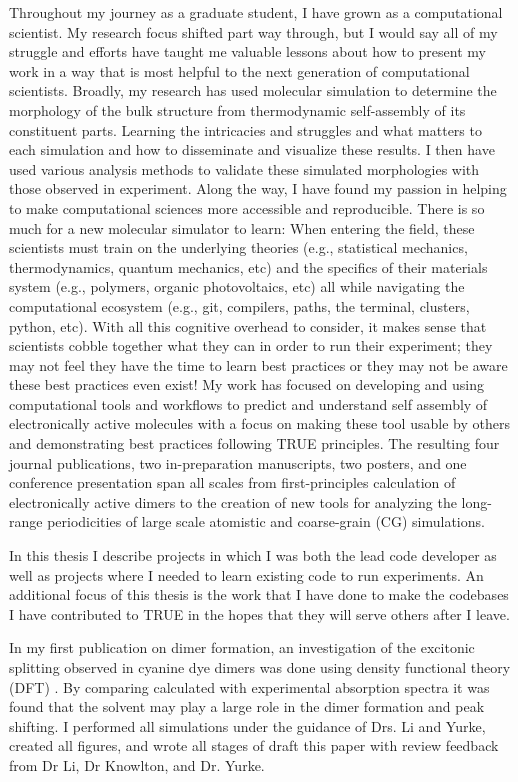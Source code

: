 Throughout my journey as a graduate student, I have grown as a computational scientist.
My research focus shifted part way through, but I would say all of my struggle and efforts have taught me valuable lessons about how to present my work in a way that is most helpful to the next generation of computational scientists.
Broadly, my research has used molecular simulation to determine the morphology of the bulk structure from thermodynamic self-assembly of its constituent parts. 
Learning the intricacies and struggles and what matters to each simulation and how to disseminate and visualize these results.
I then have used various analysis methods to validate these simulated morphologies with those observed in experiment. 
Along the way, I have found my passion in helping to make computational sciences more accessible and reproducible.
There is so much for a new molecular simulator to learn: When entering the field, these scientists must train on the underlying theories (e.g., statistical mechanics, thermodynamics, quantum mechanics, etc) and the specifics of their materials system (e.g., polymers, organic photovoltaics, etc) all while navigating the computational ecosystem (e.g., git, compilers, paths, the terminal, clusters, python, etc).
With all this cognitive overhead to consider, it makes sense that scientists cobble together what they can in order to run their experiment; they may not feel they have the time to learn best practices or they may not be aware these best practices even exist!
My work has focused on developing and using computational tools and workflows to predict and understand self assembly of electronically active molecules with a focus on making these tool usable by others and demonstrating best practices following TRUE principles.
The resulting four journal publications, two in-preparation manuscripts, two posters, and one conference presentation span all scales from first-principles calculation of electronically active dimers to the creation of new tools for analyzing the long-range periodicities of large scale atomistic and coarse-grain (CG) simulations.

In this thesis I describe projects in which I was both the lead code developer as well as projects where I needed to learn existing code to run experiments.
An additional focus of this thesis is the work that I have done to make the codebases I have contributed to TRUE in the hopes that they will serve others after I leave.

In my first publication on dimer formation, an investigation of the excitonic splitting observed in cyanine dye dimers was done using density functional theory (DFT) \cite{Fothergill2018}.
By comparing calculated with experimental absorption spectra it was found that the solvent may play a large role in the dimer formation and peak shifting.
I performed all simulations under the guidance of Drs. Li and Yurke, created all figures, and wrote all stages of draft this paper with review feedback from Dr Li, Dr Knowlton, and Dr. Yurke.

